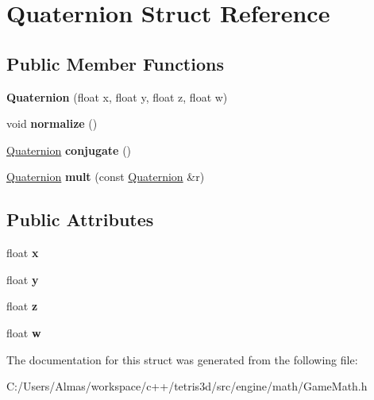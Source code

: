 \hypertarget{struct_quaternion}{\section{Quaternion Struct Reference}
\label{struct_quaternion}
}
\subsection*{Public Member Functions}
\begin{DoxyCompactItemize}
\item 
\hypertarget{struct_quaternion_af1293ea7f1913326a47270aa3a2092fe}{{\bfseries Quaternion} (float x, float y, float z, float w)}\label{struct_quaternion_af1293ea7f1913326a47270aa3a2092fe}

\item 
\hypertarget{struct_quaternion_a48e6bafb249c895ed25f29dc9170e11e}{void {\bfseries normalize} ()}\label{struct_quaternion_a48e6bafb249c895ed25f29dc9170e11e}

\item 
\hypertarget{struct_quaternion_ab674ea67691cea70557aa3a7b5f6950f}{\hyperlink{struct_quaternion}{Quaternion} {\bfseries conjugate} ()}\label{struct_quaternion_ab674ea67691cea70557aa3a7b5f6950f}

\item 
\hypertarget{struct_quaternion_a5959c09dd14288bd57b93f2b445dd1c4}{\hyperlink{struct_quaternion}{Quaternion} {\bfseries mult} (const \hyperlink{struct_quaternion}{Quaternion} \&r)}\label{struct_quaternion_a5959c09dd14288bd57b93f2b445dd1c4}

\end{DoxyCompactItemize}
\subsection*{Public Attributes}
\begin{DoxyCompactItemize}
\item 
\hypertarget{struct_quaternion_a8b80f191a3155cc0158d2b4f4d50b2cb}{float {\bfseries x}}\label{struct_quaternion_a8b80f191a3155cc0158d2b4f4d50b2cb}

\item 
\hypertarget{struct_quaternion_a3bd3f270462944423611f44e19d2511b}{float {\bfseries y}}\label{struct_quaternion_a3bd3f270462944423611f44e19d2511b}

\item 
\hypertarget{struct_quaternion_a625cb732d8ff3083e7852b86b736ab29}{float {\bfseries z}}\label{struct_quaternion_a625cb732d8ff3083e7852b86b736ab29}

\item 
\hypertarget{struct_quaternion_aa44a65ab99e36f6ab8771030eed8a7ad}{float {\bfseries w}}\label{struct_quaternion_aa44a65ab99e36f6ab8771030eed8a7ad}

\end{DoxyCompactItemize}


The documentation for this struct was generated from the following file\-:\begin{DoxyCompactItemize}
\item 
C\-:/\-Users/\-Almas/workspace/c++/tetris3d/src/engine/math/Game\-Math.\-h\end{DoxyCompactItemize}
